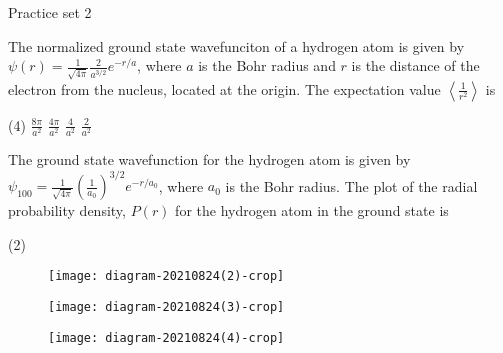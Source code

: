 \newpage
\begin{abox}
	Practice set 2
	\end{abox}
\begin{enumerate}
\begin{minipage}{\textwidth}
	\item The normalized ground state wavefunciton of a hydrogen atom is given by $\psi(r)=\frac{1}{\sqrt{4 \pi}} \frac{2}{a^{3 / 2}} e^{-r / a}$, where $a$ is the Bohr radius and $r$ is the distance of the electron from the nucleus, located at the origin. The expectation value $\left\langle\frac{1}{r^{2}}\right\rangle$ is
\end{minipage}
\begin{tasks}(4)
	\task[\textbf{A.}] $\frac{8 \pi}{a^{2}}$
	\task[\textbf{B.}]$\frac{4 \pi}{a^{2}}$
	\task[\textbf{C.}]$\frac{4}{a^{2}}$
	\task[\textbf{D.}]$\frac{2}{a^{2}}$
\end{tasks}
\begin{minipage}{\textwidth}
	\item The ground state wavefunction for the hydrogen atom is given by $\psi_{100}=\frac{1}{\sqrt{4 \pi}}\left(\frac{1}{a_{0}}\right)^{3 / 2} e^{-r / a_{0}}$, where $a_{0}$ is the Bohr radius. The plot of the radial probability density, $P(r)$ for the hydrogen atom in the ground state is
\end{minipage}
\begin{tasks}(2)
	\task[\textbf{A.}]\begin{figure}[H]
		\centering
		\texttt{[image: diagram-20210824(2)-crop]}
		
	\end{figure}
	\task[\textbf{B.}]\begin{figure}[H]
		\centering
		\texttt{[image: diagram-20210824(3)-crop]}
		
	\end{figure}
	\task[\textbf{C.}]\begin{figure}[H]
		\centering
		\texttt{[image: diagram-20210824(4)-crop]}
		

\end{figure}
\end{tasks}
\end{enumerate}

